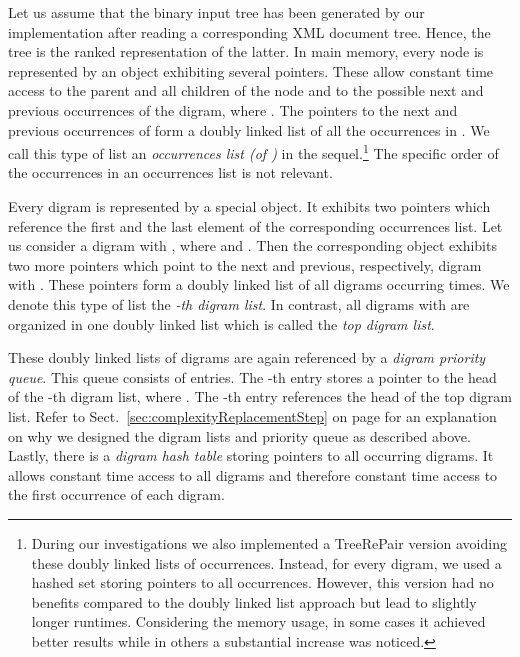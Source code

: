 \documentclass[12pt]{llncs}
\newcommand{\tp}{digram\xspace}
\newcommand{\tps}{digrams\xspace}
\newcommand{\trp}{\mbox{TreeRePair}\xspace}
\begin{document}
Let us assume that the binary input tree  has been generated by our implementation after reading a corresponding XML document tree. Hence, the tree  is the ranked representation of the latter. In main memory, every node  is represented by an object exhibiting several pointers. These allow constant time access to the parent and all children of the node  and to the possible next and previous occurrences of the \tp , where . The pointers to the next and previous occurrences of  form a doubly linked list of all the occurrences in . We call this type of list an \emph{occurrences list (of )} in the sequel.\footnote{During our investigations we also implemented a \trp version avoiding these doubly linked lists of occurrences. Instead, for every \tp, we used a hashed set storing pointers to all occurrences. However, this version had no benefits compared to the doubly linked list approach but lead to slightly longer runtimes. Considering the memory usage, in some cases it achieved better results while in others a substantial increase was noticed.} The specific order of the occurrences in an occurrences list is not relevant.

Every \tp is represented by a special object. It exhibits two pointers which reference the first and the last element of the corresponding occurrences list. Let us consider a \tp  with , where  and . Then the corresponding object exhibits two more pointers which point to the next and previous, respectively, \tp  with . These pointers form a doubly linked list of all \tps occurring  times. We denote this type of list the \emph{-th \tp list}. In contrast, all \tps  with  are organized in one doubly linked list which is called the \emph{top \tp list}.

These doubly linked lists of \tps are again referenced by a \emph{\tp priority queue}. This queue consists of  entries. The -th entry stores a pointer to the head of the -th \tp list, where . The -th entry references the head of the top \tp list. Refer to Sect.~\ref{sec:complexityReplacementStep} on page \pageref{sec:complexityReplacementStep} for an explanation on why we designed the \tp lists and priority queue as described above. Lastly, there is a \emph{\tp hash table} storing pointers to all occurring \tps. It allows constant time access to all \tps and therefore constant time access to the first occurrence of each \tp.
\end{document}
